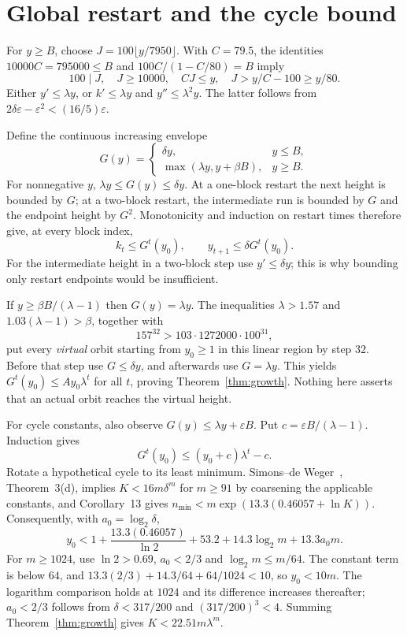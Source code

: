 \documentclass[11pt]{article}
\theoremstyle{definition}\newtheorem{definition}[theorem]{Definition}
\newcommand{\lb}{\log_2}
\newcommand{\eps}{\varepsilon}
\begin{document}
\section{Global restart and the cycle bound}\label{sec:restart}
For $y\ge B$, choose $J=100\lfloor y/7950\rfloor$. With $C=79.5$, the identities $10000C=795000\le B$ and $100C/(1-C/80)=B$ imply
\[
 100\mid J,\quad J\ge10000,\quad CJ\le y,\quad J>y/C-100\ge y/80.
\]
Either $y'\le\lambda y$, or $k'\le\lambda y$ and $y''\le\lambda^2y$. The latter follows from $2\delta\eps-\eps^2<(16/5)\eps$.

Define the continuous increasing envelope
\[
 G(y)=\begin{cases}\delta y,&y\le B,\\
       \max(\lambda y,y+\beta B),&y\ge B.
       \end{cases}
\]
For nonnegative $y$, $\lambda y\le G(y)\le\delta y$. At a one-block restart the next height is bounded by $G$; at a two-block restart, the intermediate run is bounded by $G$ and the endpoint height by $G^2$. Monotonicity and induction on restart times therefore give, at every block index,
\begin{equation}\label{eq:restartbounds}
 k_t\le G^t(y_0),\qquad y_{t+1}\le\delta G^t(y_0).
\end{equation}
For the intermediate height in a two-block step use $y'\le\delta y$; this is why bounding only restart endpoints would be insufficient.

If $y\ge\beta B/(\lambda-1)$ then $G(y)=\lambda y$. The inequalities $\lambda>1.57$ and $1.03(\lambda-1)>\beta$, together with
\[
 157^{32}>103\cdot1272000\cdot100^{31},
\]
put every \emph{virtual} orbit starting from $y_0\ge1$ in this linear region by step $32$. Before that step use $G\le\delta y$, and afterwards use $G=\lambda y$. This yields $G^t(y_0)\le Ay_0\lambda^t$ for all $t$, proving Theorem~\ref{thm:growth}. Nothing here asserts that an actual orbit reaches the virtual height.

For cycle constants, also observe $G(y)\le\lambda y+\eps B$. Put $c=\eps B/(\lambda-1)$. Induction gives
\begin{equation}\label{eq:affine}
 G^t(y_0)\le(y_0+c)\lambda^t-c.
\end{equation}
Rotate a hypothetical cycle to its least minimum. Simons--de Weger~\cite{sdw}, Theorem~3(d), implies $K<16m\delta^m$ for $m\ge91$ by coarsening the applicable constants, and Corollary~13 gives
$n_{\min}<m\exp(13.3(0.46057+\ln K))$. Consequently, with $a_0=\lb\delta$,
\[
 y_0<1+\frac{13.3(0.46057)}{\ln2}+53.2+14.3\lb m+13.3a_0m.
\]
For $m\ge1024$, use $\ln2>0.69$, $a_0<2/3$ and $\lb m\le m/64$. The constant term is below $64$, and $13.3(2/3)+14.3/64+64/1024<10$, so $y_0<10m$. The logarithm comparison holds at $1024$ and its difference increases thereafter; $a_0<2/3$ follows from $\delta<317/200$ and $(317/200)^3<4$. Summing Theorem~\ref{thm:growth} gives $K<22.51m\lambda^m$.
\end{document}
